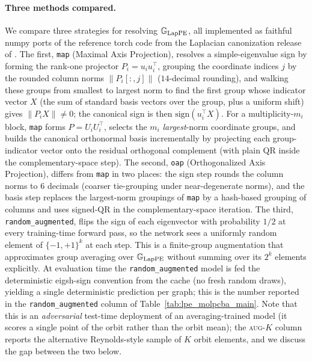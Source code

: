 \paragraph{Three methods compared.}
We compare three strategies for resolving $\mathbb{G}_{\mathrm{LapPE}}$, all
implemented as faithful numpy ports of the reference torch code from
the Laplacian canonization release of \cite{ma2023laplacian}.
The first, \texttt{map} \cite{ma2023laplacian} (Maximal Axis Projection), resolves a
simple-eigenvalue sign by forming the rank-one projector
$P_i = u_i u_i^{\top}$, grouping the coordinate indices $j$ by the
rounded column norms $\|P_i[:,j]\|$ ($14$-decimal rounding), and
walking these groups from smallest to largest norm to find the first
group whose indicator vector $X$ (the sum of standard basis vectors
over the group, plus a uniform shift) gives $\|P_i X\|\!\neq\!0$; the
canonical sign is then $\mathrm{sign}(u_i^{\top}X)$. For a
multiplicity-$m_i$ block, \texttt{map} forms $P = U_i U_i^{\top}$,
selects the $m_i$ \emph{largest}-norm coordinate groups, and builds
the canonical orthonormal basis incrementally by projecting each
group-indicator vector onto the residual orthogonal complement
(with plain QR inside the complementary-space step).
The second, \texttt{oap} \cite{ma2024canonicalization}   (Orthogonalized Axis Projection), differs
from \texttt{map} in two places: the sign step rounds the column
norms to $6$ decimals (coarser tie-grouping under near-degenerate
norms), and the basis step replaces the largest-norm groupings of
\texttt{map} by a hash-based grouping of columns and uses signed-QR
in the complementary-space iteration.
The third, \texttt{random\_augmented}, flips the sign of each
eigenvector with probability $1/2$ at every training-time forward
pass, so the network sees a uniformly random element of
$\{-1,+1\}^{k}$ at each step. This is a finite-group augmentation
that approximates group averaging over $\mathbb{G}_{\mathrm{LapPE}}$ without
summing over its $2^{k}$ elements explicitly. At evaluation time the
\texttt{random\_augmented} model is fed the deterministic eigsh-sign
convention from the cache (no fresh random draws), yielding a single
deterministic prediction per graph; this is the number reported in
the \texttt{random\_augmented} column of
Table~\ref{tab:lpe_molpcba_main}. Note that this is an
\emph{adversarial} test-time deployment of an averaging-trained model
(it scores a single point of the orbit rather than the orbit mean);
the \textsc{aug-$K$} column reports the alternative Reynolds-style
sample of $K$ orbit elements, and we discuss the gap between the
two below.

